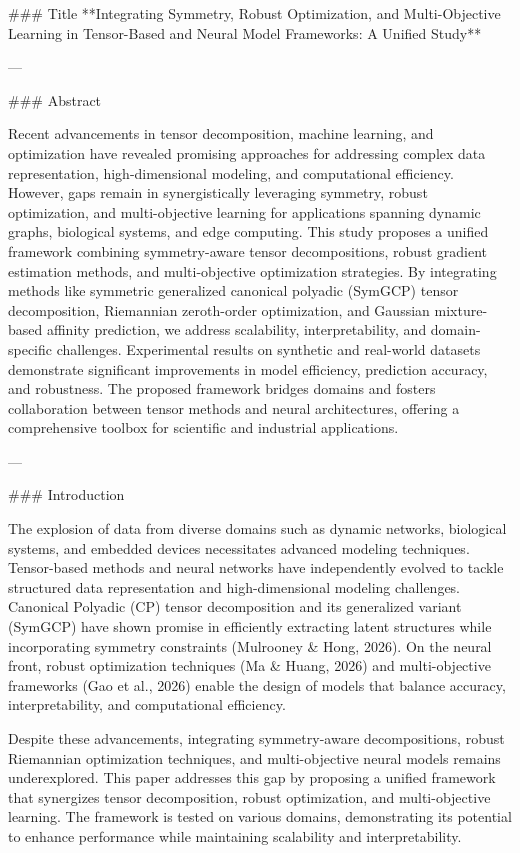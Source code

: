 ### Title
**Integrating Symmetry, Robust Optimization, and Multi-Objective Learning in Tensor-Based and Neural Model Frameworks: A Unified Study**

---

### Abstract

Recent advancements in tensor decomposition, machine learning, and optimization have revealed promising approaches for addressing complex data representation, high-dimensional modeling, and computational efficiency. However, gaps remain in synergistically leveraging symmetry, robust optimization, and multi-objective learning for applications spanning dynamic graphs, biological systems, and edge computing. This study proposes a unified framework combining symmetry-aware tensor decompositions, robust gradient estimation methods, and multi-objective optimization strategies. By integrating methods like symmetric generalized canonical polyadic (SymGCP) tensor decomposition, Riemannian zeroth-order optimization, and Gaussian mixture-based affinity prediction, we address scalability, interpretability, and domain-specific challenges. Experimental results on synthetic and real-world datasets demonstrate significant improvements in model efficiency, prediction accuracy, and robustness. The proposed framework bridges domains and fosters collaboration between tensor methods and neural architectures, offering a comprehensive toolbox for scientific and industrial applications.

---

### Introduction

The explosion of data from diverse domains such as dynamic networks, biological systems, and embedded devices necessitates advanced modeling techniques. Tensor-based methods and neural networks have independently evolved to tackle structured data representation and high-dimensional modeling challenges. Canonical Polyadic (CP) tensor decomposition and its generalized variant (SymGCP) have shown promise in efficiently extracting latent structures while incorporating symmetry constraints (Mulrooney & Hong, 2026). On the neural front, robust optimization techniques (Ma & Huang, 2026) and multi-objective frameworks (Gao et al., 2026) enable the design of models that balance accuracy, interpretability, and computational efficiency.

Despite these advancements, integrating symmetry-aware decompositions, robust Riemannian optimization techniques, and multi-objective neural models remains underexplored. This paper addresses this gap by proposing a unified framework that synergizes tensor decomposition, robust optimization, and multi-objective learning. The framework is tested on various domains, demonstrating its potential to enhance performance while maintaining scalability and interpretability.

